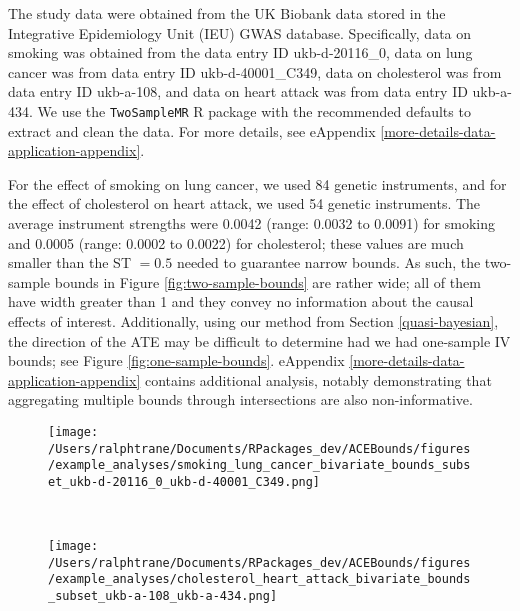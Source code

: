 \documentclass[
]{article}
\theoremstyle{plain}
\begin{document}
The study data were obtained from the UK Biobank data stored in the Integrative Epidemiology Unit (IEU) GWAS database. Specifically, data on smoking was obtained from the data entry ID ukb-d-20116\_0, data on lung cancer was from data entry ID ukb-d-40001\_C349, data on cholesterol was from data entry ID ukb-a-108, and data on heart attack was from data entry ID ukb-a-434. We use the \texttt{TwoSampleMR} R package \autocite{mrbase} with the recommended defaults to extract and clean the data. For more details, see eAppendix \ref{more-details-data-application-appendix}.

For the effect of smoking on lung cancer, we used 84 genetic instruments, and for the effect of cholesterol on heart attack, we used 54 genetic instruments. The average instrument strengths were 0.0042 (range: 0.0032 to 0.0091) for smoking and 0.0005 (range: 0.0002 to 0.0022) for cholesterol; these values are much smaller than the ST \(= 0.5\) needed to guarantee narrow bounds. As such, the two-sample bounds in Figure \ref{fig:two-sample-bounds} are rather wide; all of them have width greater than 1 and they convey no information about the causal effects of interest. Additionally, using our method from Section \ref{quasi-bayesian}, the direction of the ATE may be difficult to determine had we had one-sample IV bounds; see Figure \ref{fig:one-sample-bounds}. eAppendix \ref{more-details-data-application-appendix} contains additional analysis, notably demonstrating that aggregating multiple bounds through intersections are also non-informative.

\begin{figure*}
  \centering
  \begin{subfigure}{0.5\linewidth}
  \caption{}
  \texttt{[image: /Users/ralphtrane/Documents/RPackages\_dev/ACEBounds/figures/example\_analyses/smoking\_lung\_cancer\_bivariate\_bounds\_subset\_ukb-d-20116\_0\_ukb-d-40001\_C349.png]}
  \label{fig:two-sample-bounds-smoking}
  \end{subfigure}%
  ~
  \begin{subfigure}{0.5\linewidth}
  \caption{}
  \texttt{[image: /Users/ralphtrane/Documents/RPackages\_dev/ACEBounds/figures/example\_analyses/cholesterol\_heart\_attack\_bivariate\_bounds\_subset\_ukb-a-108\_ukb-a-434.png]}
  \label{fig:two-sample-bounds-cholesterol}
  \end{subfigure}
  \caption{Two-sample IV bounds for the two real data examples with 8 SNPs from each data set. A: Two-sample IV bounds for the ATE of smoking on the incidence of lung cancer. B: Two-sample IV bounds for the ATE of high cholesterol on the incidence of heart attack.}
  \label{fig:two-sample-bounds}
\end{figure*}
\end{document}
